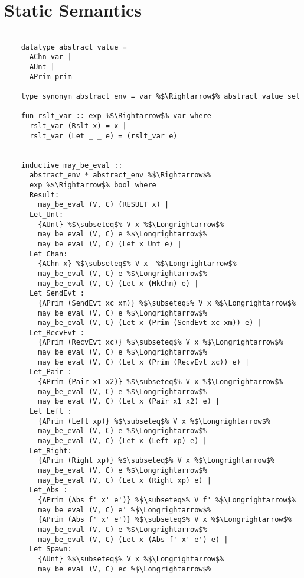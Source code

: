 \documentclass{article}
\begin{document}
\section{Static Semantics}
  \begin{lstlisting}[style=codestyle1, escapechar=\%]

    datatype abstract_value =
      AChn var |
      AUnt |
      APrim prim

    type_synonym abstract_env = var %$\Rightarrow$% abstract_value set

    fun rslt_var :: exp %$\Rightarrow$% var where
      rslt_var (Rslt x) = x |
      rslt_var (Let _ _ e) = (rslt_var e)


    inductive may_be_eval ::
      abstract_env * abstract_env %$\Rightarrow$%
      exp %$\Rightarrow$% bool where
      Result:
        may_be_eval (V, C) (RESULT x) |
      Let_Unt:
        {AUnt} %$\subseteq$% V x %$\Longrightarrow$%
        may_be_eval (V, C) e %$\Longrightarrow$% 
        may_be_eval (V, C) (Let x Unt e) |
      Let_Chan: 
        {AChn x} %$\subseteq$% V x  %$\Longrightarrow$%
        may_be_eval (V, C) e %$\Longrightarrow$%
        may_be_eval (V, C) (Let x (MkChn) e) |
      Let_SendEvt : 
        {APrim (SendEvt xc xm)} %$\subseteq$% V x %$\Longrightarrow$%
        may_be_eval (V, C) e %$\Longrightarrow$% 
        may_be_eval (V, C) (Let x (Prim (SendEvt xc xm)) e) |
      Let_RecvEvt :
        {APrim (RecvEvt xc)} %$\subseteq$% V x %$\Longrightarrow$%
        may_be_eval (V, C) e %$\Longrightarrow$% 
        may_be_eval (V, C) (Let x (Prim (RecvEvt xc)) e) |
      Let_Pair : 
        {APrim (Pair x1 x2)} %$\subseteq$% V x %$\Longrightarrow$%
        may_be_eval (V, C) e %$\Longrightarrow$% 
        may_be_eval (V, C) (Let x (Pair x1 x2) e) |
      Let_Left : 
        {APrim (Left xp)} %$\subseteq$% V x %$\Longrightarrow$%
        may_be_eval (V, C) e %$\Longrightarrow$% 
        may_be_eval (V, C) (Let x (Left xp) e) |
      Let_Right:
        {APrim (Right xp)} %$\subseteq$% V x %$\Longrightarrow$%
        may_be_eval (V, C) e %$\Longrightarrow$% 
        may_be_eval (V, C) (Let x (Right xp) e) |
      Let_Abs : 
        {APrim (Abs f' x' e')} %$\subseteq$% V f' %$\Longrightarrow$%
        may_be_eval (V, C) e' %$\Longrightarrow$%
        {APrim (Abs f' x' e')} %$\subseteq$% V x %$\Longrightarrow$%
        may_be_eval (V, C) e %$\Longrightarrow$% 
        may_be_eval (V, C) (Let x (Abs f' x' e') e) |
      Let_Spawn:
        {AUnt} %$\subseteq$% V x %$\Longrightarrow$%
        may_be_eval (V, C) ec %$\Longrightarrow$% 

\end{lstlisting}
\end{document}
